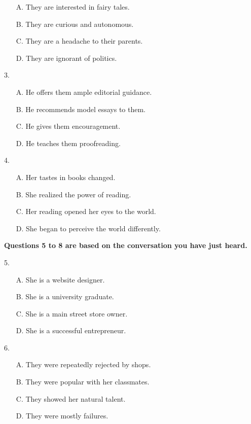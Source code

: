 \documentclass[UTF8,11pt]{ctexart}
\begin{document}
\begin{itemize}[leftmargin=2em,itemsep=.2em,topsep=.4em]\item[A.] They are interested in fairy tales.
\item[B.] They are curious and autonomous.
\item[C.] They are a headache to their parents.
\item[D.] They are ignorant of politics.
\end{itemize}

3.


\begin{itemize}[leftmargin=2em,itemsep=.2em,topsep=.4em]\item[A.] He offers them ample editorial guidance.
\item[B.] He recommends model essays to them.
\item[C.] He gives them encouragement.
\item[D.] He teaches them proofreading.
\end{itemize}

4.


\begin{itemize}[leftmargin=2em,itemsep=.2em,topsep=.4em]\item[A.] Her tastes in books changed.
\item[B.] She realized the power of reading.
\item[C.] Her reading opened her eyes to the world.
\item[D.] She began to perceive the world differently.
\end{itemize}

\textbf{Questions 5 to 8 are based on the conversation you have just heard.}


5.


\begin{itemize}[leftmargin=2em,itemsep=.2em,topsep=.4em]\item[A.] She is a website designer.
\item[B.] She is a university graduate.
\item[C.] She is a main street store owner.
\item[D.] She is a successful entrepreneur.
\end{itemize}

6.


\begin{itemize}[leftmargin=2em,itemsep=.2em,topsep=.4em]\item[A.] They were repeatedly rejected by shops.
\item[B.] They were popular with her classmates.
\item[C.] They showed her natural talent.
\item[D.] They were mostly failures.
\end{itemize}
\end{document}
